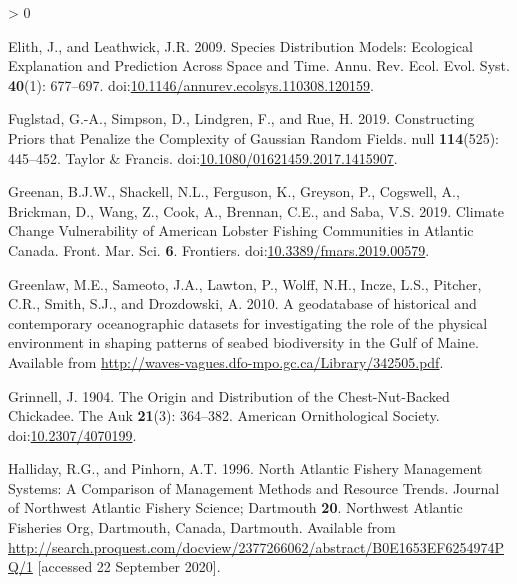 \documentclass[
]{article}
\newlength{\cslhangindent}
\newenvironment{CSLReferences}[2] %
 {%
  \setlength{\parindent}{0pt}
  \ifodd #1 \everypar{\setlength{\hangindent}{\cslhangindent}}\ignorespaces\fi
  \ifnum #2 > 0
  \setlength{\parskip}{#2\baselineskip}
  \fi
 }%
 {}
\begin{document}
\begin{CSLReferences}{1}{0}
\leavevmode\hypertarget{ref-elithSpeciesDistributionModels2009}{}%
Elith, J., and Leathwick, J.R. 2009. Species {Distribution Models}: {Ecological Explanation} and {Prediction Across Space} and {Time}. Annu. Rev. Ecol. Evol. Syst. \textbf{40}(1): 677--697. doi:\href{https://doi.org/10.1146/annurev.ecolsys.110308.120159}{10.1146/annurev.ecolsys.110308.120159}.

\leavevmode\hypertarget{ref-fuglstadConstructingPriorsThat2019}{}%
Fuglstad, G.-A., Simpson, D., Lindgren, F., and Rue, H. 2019. Constructing {Priors} that {Penalize} the {Complexity} of {Gaussian Random Fields}. null \textbf{114}(525): 445--452. {Taylor \& Francis}. doi:\href{https://doi.org/10.1080/01621459.2017.1415907}{10.1080/01621459.2017.1415907}.

\leavevmode\hypertarget{ref-greenanClimateChangeVulnerability2019}{}%
Greenan, B.J.W., Shackell, N.L., Ferguson, K., Greyson, P., Cogswell, A., Brickman, D., Wang, Z., Cook, A., Brennan, C.E., and Saba, V.S. 2019. Climate {Change Vulnerability} of {American Lobster Fishing Communities} in {Atlantic Canada}. Front. Mar. Sci. \textbf{6}. {Frontiers}. doi:\href{https://doi.org/10.3389/fmars.2019.00579}{10.3389/fmars.2019.00579}.

\leavevmode\hypertarget{ref-greenlawGeodatabaseHistoricalContemporary2010}{}%
Greenlaw, M.E., Sameoto, J.A., Lawton, P., Wolff, N.H., Incze, L.S., Pitcher, C.R., Smith, S.J., and Drozdowski, A. 2010. A geodatabase of historical and contemporary oceanographic datasets for investigating the role of the physical environment in shaping patterns of seabed biodiversity in the {Gulf} of {Maine}. Available from \url{http://waves-vagues.dfo-mpo.gc.ca/Library/342505.pdf}.

\leavevmode\hypertarget{ref-grinnellOriginDistributionChestNutBacked1904}{}%
Grinnell, J. 1904. The {Origin} and {Distribution} of the {Chest}-{Nut}-{Backed Chickadee}. The Auk \textbf{21}(3): 364--382. {American Ornithological Society}. doi:\href{https://doi.org/10.2307/4070199}{10.2307/4070199}.

\leavevmode\hypertarget{ref-hallidayNorthAtlanticFishery1996}{}%
Halliday, R.G., and Pinhorn, A.T. 1996. North {Atlantic Fishery Management Systems}: {A Comparison} of {Management Methods} and {Resource Trends}. Journal of Northwest Atlantic Fishery Science; Dartmouth \textbf{20}. {Northwest Atlantic Fisheries Org}, {Dartmouth, Canada, Dartmouth}. Available from \url{http://search.proquest.com/docview/2377266062/abstract/B0E1653EF6254974PQ/1} {[}accessed 22 September 2020{]}.


\end{CSLReferences}
\end{document}
